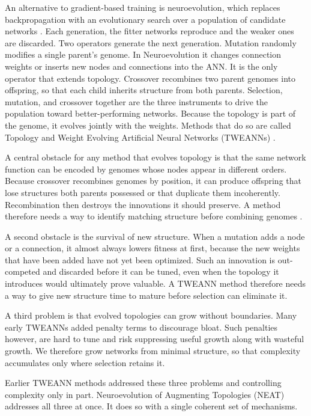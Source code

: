 \documentclass[12pt]{article}
\begin{document}

An alternative to gradient-based training is neuroevolution, which replaces backpropagation with an evolutionary search over a population of candidate networks \parencite{stanley_designing_2019}.
Each generation, the fitter networks reproduce and the weaker ones are discarded.
Two operators generate the next generation.
Mutation randomly modifies a single parent's genome. In Neuroevolution it changes connection weights or inserts new nodes and connections into the ANN. It is the only operator that extends topology.
Crossover recombines two parent genomes into offspring, so that each child inherits structure from both parents.
Selection, mutation, and crossover together are the three instruments to drive the population toward better-performing networks.
Because the topology is part of the genome, it evolves jointly with the weights. Methods that do so are called Topology and Weight Evolving Artificial Neural Networks (TWEANNs) \parencite{stanley_evolving_2002}.

A central obstacle for any method that evolves topology is that the same network function can be encoded by genomes whose nodes appear in different orders.
Because crossover recombines genomes by position, it can produce offspring that lose structures both parents possessed or that duplicate them incoherently.
Recombination then destroys the innovations it should preserve.
A method therefore needs a way to identify matching structure before combining genomes \parencite{stanley_evolving_2002}.

A second obstacle is the survival of new structure.
When a mutation adds a node or a connection, it almost always lowers fitness at first, because the new weights that have been added have not yet been optimized.
Such an innovation is out-competed and discarded before it can be tuned, even when the topology it introduces would ultimately prove valuable.
A TWEANN method therefore needs a way to give new structure time to mature before selection can eliminate it.

A third problem is that evolved topologies can grow without boundaries.
Many early TWEANNs added penalty terms to discourage bloat.
Such penalties however, are hard to tune and risk suppressing useful growth along with wasteful growth.
We therefore grow networks from minimal structure, so that complexity accumulates only where selection retains it.

Earlier TWEANN methods addressed these three problems and controlling complexity only in part.
Neuroevolution of Augmenting Topologies (NEAT) \parencite{stanley_evolving_2002} addresses all three at once.
It does so with a single coherent set of mechanisms.
\end{document}
